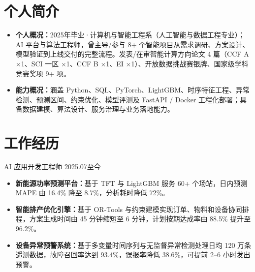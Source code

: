 \documentclass{claritycv}
\begin{document}

\section{个人简介}
\begin{itemize}
  \item \textbf{个人概况：}2025年毕业·计算机与智能工程系（人工智能与数据工程专业）；AI 平台与算法工程师，曾主导/参与 8+ 个智能项目从需求调研、方案设计、模型验证到上线交付的完整流程。发表/在审智能计算方向论文 4 篇（CCF A ×1、SCI 一区 ×1、CCF B ×1、EI ×1）、开放数据挑战赛银牌、国家级学科竞赛奖项 9+ 项。
  \item \textbf{能力概况：}涵盖 Python、SQL、PyTorch、LightGBM、时序特征工程、异常检测、预测区间、约束优化、模型评测及 FastAPI / Docker 工程化部署；具备数据建模、算法设计、服务治理与业务落地能力。
\end{itemize}

\section{工作经历}

  {AI 应用开发工程师}
  {2025.07}{至今}
\begin{itemize}
  \item \textbf{新能源功率预测平台：}基于 TFT 与 LightGBM 服务 60+ 个场站，日内预测 MAPE 由 16.4\% 降至 8.7\%，分析耗时降低 72\%。
  \item \textbf{智能排产优化引擎：}基于 OR-Tools 与约束建模实现订单、物料和设备协同排程，方案生成时间由 45 分钟缩短至 6 分钟，计划按期达成率由 88.5\% 提升至 96.2\%。
  \item \textbf{设备异常预警系统：}基于多变量时间序列与无监督异常检测处理日均 120 万条遥测数据，故障召回率达到 93.4\%，误报率降低 38.6\%，可提前 2--6 小时发出预警。
\end{itemize}
\end{document}
